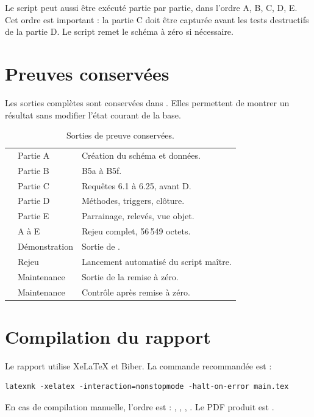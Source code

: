 Le script peut aussi être exécuté partie par partie, dans l'ordre A, B, C, D,
E. Cet ordre est important : la partie C doit être capturée avant les tests
destructifs de la partie D. Le script  remet le schéma
à zéro si nécessaire.

\section{Preuves conservées}

Les sorties complètes sont conservées dans . Elles permettent
de montrer un résultat sans modifier l'état courant de la base.

\begin{table}[htbp]
  \centering
  \small
  \caption{Sorties de preuve conservées.}
  \label{tab:preuves}
  \begin{tabularx}{\textwidth}{@{}L{3.8cm}L{3.2cm}X@{}}
    \toprule
     &  &  \\
    \midrule
     & Partie A & Création du schéma et données. \\
     & Partie B & B5a à B5f. \\
     & Partie C & Requêtes 6.1 à 6.25, avant D. \\
     & Partie D & Méthodes, triggers, clôture. \\
     & Partie E & Parrainage, relevés, vue objet. \\
     & A à E & Rejeu complet, 56\,549 octets. \\
     & Démonstration & Sortie de . \\
     & Rejeu & Lancement automatisé du script maître. \\
     & Maintenance & Sortie de la remise à zéro. \\
     & Maintenance & Contrôle après remise à zéro. \\
    \bottomrule
  \end{tabularx}
\end{table}

\section{Compilation du rapport}

Le rapport utilise XeLaTeX et Biber. La commande recommandée est :

\begin{lstlisting}[caption={Compilation du rapport.},label={lst:compilation},language={}]
latexmk -xelatex -interaction=nonstopmode -halt-on-error main.tex
\end{lstlisting}

En cas de compilation manuelle, l'ordre est : , ,
, . Le PDF produit est .
